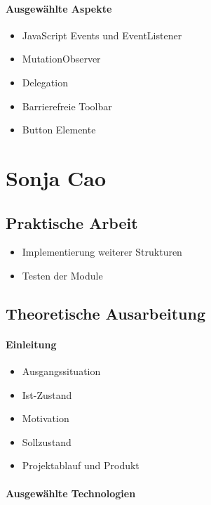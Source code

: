 \paragraph{Ausgewählte Aspekte}

\begin{itemize}
	\item JavaScript Events und EventListener
	\item MutationObserver
	\item Delegation
	\item Barrierefreie Toolbar
	\item Button Elemente
\end{itemize}

\section{Sonja Cao}

\subsection{Praktische Arbeit}

\begin{itemize}
	\item Implementierung weiterer Strukturen 
	\item Testen der Module
\end{itemize}

\subsection{Theoretische Ausarbeitung}

\paragraph{Einleitung}

\begin{itemize}
	\item Ausgangssituation
	\item Ist-Zustand
	\item Motivation
	\item Sollzustand
	\item Projektablauf und Produkt
\end{itemize}

\paragraph{Ausgewählte Technologien}

